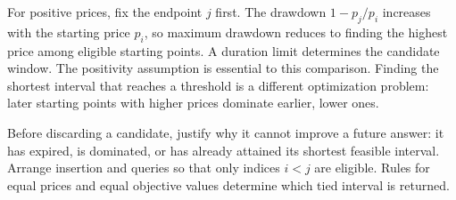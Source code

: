 For positive prices, fix the endpoint $j$ first. The drawdown $1-p_j/p_i$ increases with the starting price $p_i$, so maximum drawdown reduces to finding the highest price among eligible starting points. A duration limit determines the candidate window. The positivity assumption is essential to this comparison. Finding the shortest interval that reaches a threshold is a different optimization problem: later starting points with higher prices dominate earlier, lower ones.

Before discarding a candidate, justify why it cannot improve a future answer: it has expired, is dominated, or has already attained its shortest feasible interval. Arrange insertion and queries so that only indices $i<j$ are eligible. Rules for equal prices and equal objective values determine which tied interval is returned.
\par\smallskip
